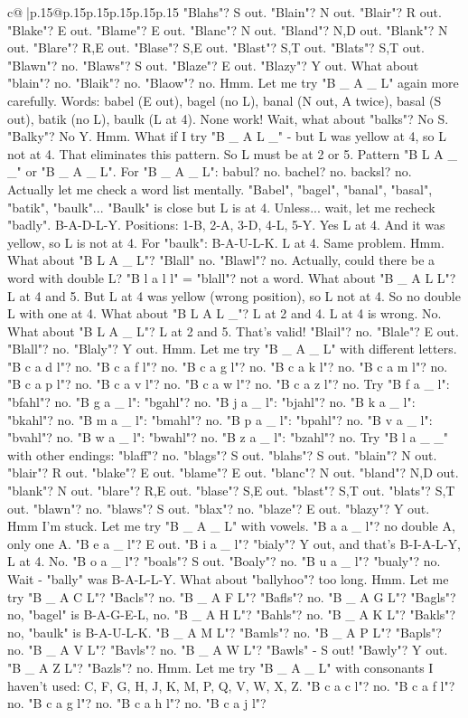 \documentclass{article}
\begin{document}
{\begin{supertabular}{c@{$\;$}|p{.15\linewidth}@{}p{.15\linewidth}p{.15\linewidth}p{.15\linewidth}p{.15\linewidth}p{.15\linewidth}}
{{{"Blahs"? S out. "Blain"? N out. "Blair"? R out. "Blake"? E out. "Blame"? E out. "Blanc"? N out. "Bland"? N,D out. "Blank"? N out. "Blare"? R,E out. "Blase"? S,E out. "Blast"? S,T out. "Blats"? S,T out. "Blawn"? no. "Blaws"? S out. "Blaze"? E out. "Blazy"? Y out. What about "blain"? no. "Blaik"? no. "Blaow"? no. Hmm. Let me try "B \_ A \_ L" again more carefully. Words: babel (E out), bagel (no L), banal (N out, A twice), basal (S out), batik (no L), baulk (L at 4). None work! Wait, what about "balks"? No S. "Balky"? No Y. Hmm. What if I try "B \_ A L \_" {-} but L was yellow at 4, so L not at 4. That eliminates this pattern. So L must be at 2 or 5. Pattern "B L A \_ \_" or "B \_ A \_ L". For "B \_ A \_ L": babul? no. bachel? no. backsl? no. Actually let me check a word list mentally. "Babel", "bagel", "banal", "basal", "batik", "baulk"... "Baulk" is close but L is at 4. Unless... wait, let me recheck "badly". B{-}A{-}D{-}L{-}Y. Positions: 1{-}B, 2{-}A, 3{-}D, 4{-}L, 5{-}Y. Yes L at 4. And it was yellow, so L is not at 4. For "baulk": B{-}A{-}U{-}L{-}K. L at 4. Same problem. Hmm. What about "B L A \_ L"? "Blall" no. "Blawl"? no. Actually, could there be a word with double L? "B l a l l" = "blall"? not a word. What about "B \_ A L L"? L at 4 and 5. But L at 4 was yellow (wrong position), so L not at 4. So no double L with one at 4. What about "B L A L \_"? L at 2 and 4. L at 4 is wrong. No. What about "B L A \_ L"? L at 2 and 5. That's valid! "Blail"? no. "Blale"? E out. "Blall"? no. "Blaly"? Y out. Hmm. Let me try "B \_ A \_ L" with different letters. "B c a d l"? no. "B c a f l"? no. "B c a g l"? no. "B c a k l"? no. "B c a m l"? no. "B c a p l"? no. "B c a v l"? no. "B c a w l"? no. "B c a z l"? no. Try "B f a \_ l": "bfahl"? no. "B g a \_ l": "bgahl"? no. "B j a \_ l": "bjahl"? no. "B k a \_ l": "bkahl"? no. "B m a \_ l": "bmahl"? no. "B p a \_ l": "bpahl"? no. "B v a \_ l": "bvahl"? no. "B w a \_ l": "bwahl"? no. "B z a \_ l": "bzahl"? no. Try "B l a \_ \_" with other endings: "blaff"? no. "blags"? S out. "blahs"? S out. "blain"? N out. "blair"? R out. "blake"? E out. "blame"? E out. "blanc"? N out. "bland"? N,D out. "blank"? N out. "blare"? R,E out. "blase"? S,E out. "blast"? S,T out. "blats"? S,T out. "blawn"? no. "blaws"? S out. "blax"? no. "blaze"? E out. "blazy"? Y out. Hmm I'm stuck. Let me try "B \_ A \_ L" with vowels. "B a a \_ l"? no double A, only one A. "B e a \_ l"? E out. "B i a \_ l"? "bialy"? Y out, and that's B{-}I{-}A{-}L{-}Y, L at 4. No. "B o a \_ l"? "boals"? S out. "Boaly"? no. "B u a \_ l"? "bualy"? no. Wait {-} "bally" was B{-}A{-}L{-}L{-}Y. What about "ballyhoo"? too long. Hmm. Let me try "B \_ A C L"? "Bacls"? no. "B \_ A F L"? "Bafls"? no. "B \_ A G L"? "Bagls"? no, "bagel" is B{-}A{-}G{-}E{-}L, no. "B \_ A H L"? "Bahls"? no. "B \_ A K L"? "Bakls"? no, "baulk" is B{-}A{-}U{-}L{-}K. "B \_ A M L"? "Bamls"? no. "B \_ A P L"? "Bapls"? no. "B \_ A V L"? "Bavls"? no. "B \_ A W L"? "Bawls" {-} S out! "Bawly"? Y out. "B \_ A Z L"? "Bazls"? no. Hmm. Let me try "B \_ A \_ L" with consonants I haven't used: C, F, G, H, J, K, M, P, Q, V, W, X, Z. "B c a c l"? no. "B c a f l"? no. "B c a g l"? no. "B c a h l"? no. "B c a j l"? }}}
\end{supertabular}}
\end{document}
